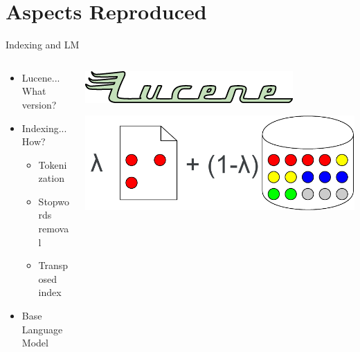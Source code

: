 \section{Aspects Reproduced}
\begin{frame}{Indexing and LM}
    \begin{columns}
        \begin{column}{0.5\textwidth}
            \begin{itemize}
                \item Lucene... What version?
            \end{itemize}
            \bigskip
            \begin{itemize}
                \item Indexing... How?
                      \begin{itemize}
                          \item Tokenization
                          \item Stopwords removal
                          \item Transposed index
                      \end{itemize}
            \end{itemize}
            \bigskip
            \begin{itemize}
                \item Base Language Model
            \end{itemize}
        \end{column}
        \begin{column}{0.5\textwidth}

            \bigskip
            \includegraphics[width=\columnwidth]{img/lucene_logo.png}
            
            \bigskip
            \bigskip
            \bigskip
            \bigskip
            \bigskip
            \bigskip
            \includegraphics[width=\columnwidth]{img/lm.pdf}
        \end{column}
    \end{columns}
\end{frame}

